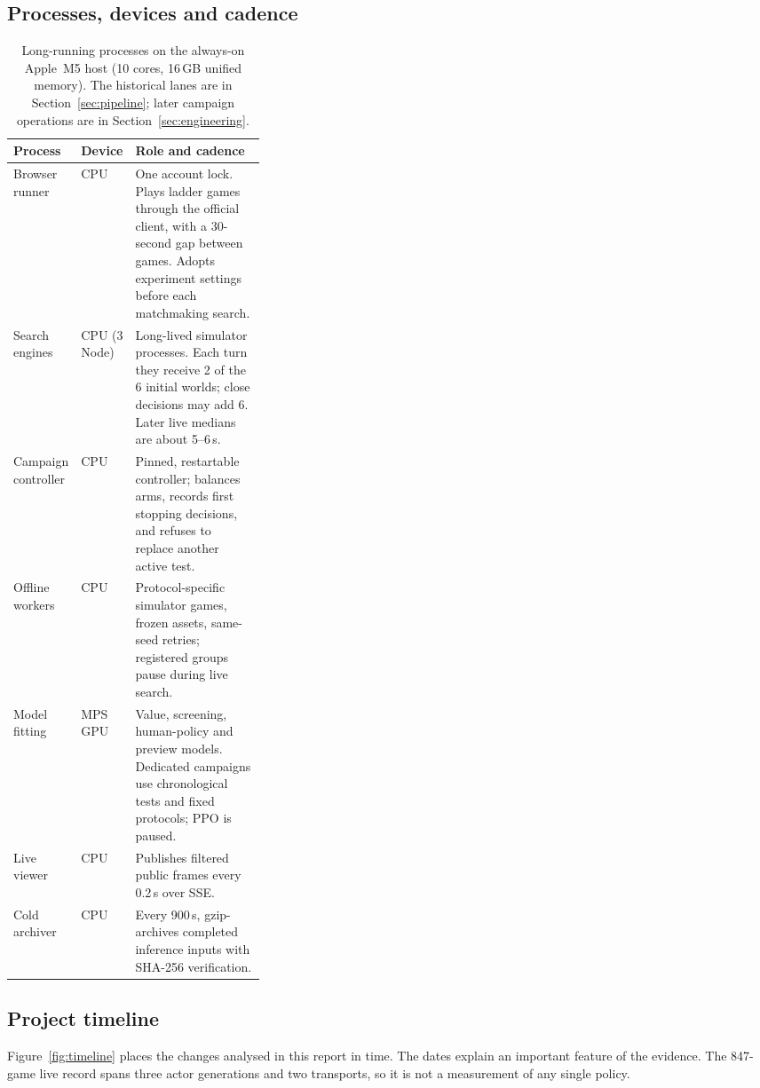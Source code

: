 \subsection{Processes, devices and cadence}
\begin{table}[htbp]
\centering\small
\begin{tabularx}{\linewidth}{>{\raggedright\arraybackslash}p{0.2\linewidth}
  >{\raggedright\arraybackslash}p{0.13\linewidth} X}
\toprule
Process & Device & Role and cadence \\
\midrule
Browser runner & CPU & One account lock. Plays ladder games through the
official client, with a 30-second gap between games. Adopts experiment settings before
each matchmaking search. \\
Search engines & CPU (3 Node) & Long-lived simulator processes. Each turn they
receive 2 of the 6 initial worlds; close decisions may add 6. Later live medians are about 5--6\,s. \\
Campaign controller & CPU & Pinned, restartable controller; balances arms,
records first stopping decisions, and refuses to replace another active test. \\
Offline workers & CPU & Protocol-specific simulator games, frozen assets,
same-seed retries; registered groups pause during live search. \\
Model fitting & MPS GPU & Value, screening, human-policy and preview models.
Dedicated campaigns use chronological tests and fixed protocols; PPO is paused. \\
Live viewer & CPU & Publishes filtered public frames every 0.2\,s over SSE. \\
Cold archiver & CPU & Every 900\,s, gzip-archives completed inference inputs
with SHA-256 verification. \\
\bottomrule
\end{tabularx}
\caption{Long-running processes on the always-on Apple~M5 host (10 cores,
16\,GB unified memory). The historical lanes are in Section~\ref{sec:pipeline}; later campaign operations are in Section~\ref{sec:engineering}.}
\label{tab:processes}
\end{table}

\subsection{Project timeline}
Figure~\ref{fig:timeline} places the changes analysed in this report in
time. The dates explain an important feature of the evidence. The 847-game
live record spans three actor generations and two transports, so it is not
a measurement of any single policy.

